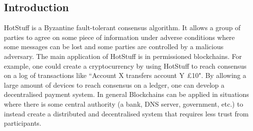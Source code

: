 




\subsection{Introduction}
HotStuff is a Byzantine fault-tolerant consensus algorithm. It allows a group of parties to agree on some piece of information under adverse conditions where some messages can be lost and some parties are controlled by a malicious adversary. The main application of HotStuff is in permissioned blockchains. For example, one could create a cryptocurrency by using HotStuff to reach consensus on a log of transactions like ``Account X transfers account Y £10". By allowing a large amount of devices to reach consensus on a ledger, one can develop a decentralised payment system. In general Blockchains can be applied in situations where there is some central authority (a bank, DNS server, government, etc.) to instead create a distributed and decentralised system that requires less trust from participants.

